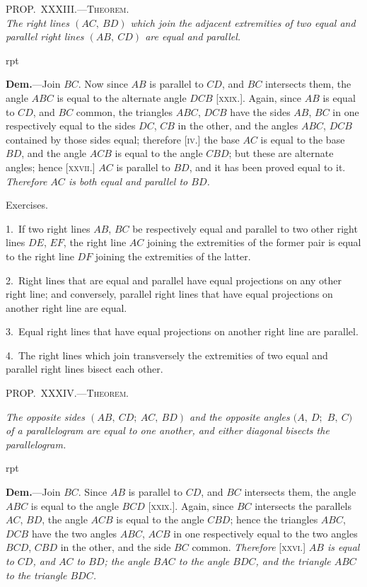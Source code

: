 \documentclass[oneside]{book}
\newcommand\myprop[2]{
\bigskip\Needspace*{4\baselineskip}\begin{center}\textsc{#1}\\\medskip\emph{#2}\par\end{center}
}
\newcommand\mypropl[2]{
\bigskip\Needspace*{4\baselineskip}\begin{center}\textsc{#1}\end{center}
\hspace{\parindent}\emph{#2}\par\medskip
}
\newcommand\exhead[1]{
\Needspace*{5\baselineskip}\begin{center}
\textsf{#1}
\end{center}
}
\newcommand\imgflow[3]{
\setcounter{wrapwidth}{#1}
\begin{wrapfigure}[#2]{r}{\value{wrapwidth}pt}
\begin{center}
\vspace{-0.3in}
\end{center}
\end{wrapfigure}
}
\begin{document}
\myprop{PROP\@.~XXXIII\@.---Theorem.}{The right lines $(AC,\ BD)$ which join the adjacent extremities
of two equal and parallel right lines $(AB,\ CD)$ are equal and parallel.}

\imgflow{133}{9}{f053}

\textbf{Dem.}---Join $BC$. Now since $AB$ is parallel to $CD$,
and $BC$ intersects them, the
angle $ABC$ is equal to the
alternate angle $DCB$ [\textsc{xxix.}].
Again, since $AB$ is equal to
$CD$, and $BC$ common, the triangles
$ABC$, $DCB$ have the
sides $AB$, $BC$ in one respectively
equal to the sides $DC$,
$CB$ in the other, and the angles $ABC$, $DCB$ contained
by those sides equal; therefore [\textsc{iv.}] the base $AC$ is
equal to the base $BD$, and the angle $ACB$ is equal to
the angle $CBD$; but these are alternate angles; hence
[\textsc{xxvii.}] $AC$ is parallel to $BD$, and it has been proved
equal to it. \emph{Therefore $AC$ is both equal and parallel to $BD$.}


\exhead{Exercises.}

\begin{footnotesize}
1.~If two right lines $AB$, $BC$ be respectively equal and parallel
to two other right lines $DE$, $EF$, the right line $AC$ joining the
extremities of the former pair is equal to the right line $DF$ joining
the extremities of the latter.

2.~Right lines that are equal and parallel have equal projections
on any other right line; and conversely, parallel right lines that
have equal projections on another right line are equal.

3.~Equal right lines that have equal projections on another
right line are parallel.

4.~The right lines which join transversely the extremities of
two equal and parallel right lines bisect each other.
\par\end{footnotesize}


\mypropl{PROP\@.~XXXIV\@.---Theorem.}{The opposite sides $(AB,\ CD;\ AC,\ BD)$ and the opposite
angles $(A,\ D;$ $B,\ C)$ of a parallelogram are equal to
one another, and either diagonal bisects the parallelogram.}

\imgflow{133}{8}{f054}

\textbf{Dem.}---Join $BC$. Since $AB$ is parallel to $CD$, and
$BC$ intersects them, the angle
$ABC$ is equal to the angle
$BCD$ [\textsc{xxix.}]. Again, since
$BC$ intersects the parallels $AC$,
$BD$, the angle $ACB$ is equal to
the angle $CBD$; hence the triangles
$ABC$, $DCB$ have the two
angles $ABC$, $ACB$ in one respectively
equal to the two angles $BCD$, $CBD$ in the other,
and the side $BC$ common. \emph{Therefore} [\textsc{xxvi.}] \emph{$AB$ is equal
to $CD$, and $AC$ to $BD$; the angle $BAC$ to the angle $BDC$,
and the triangle $ABC$ to the triangle $BDC$.}
\end{document}
